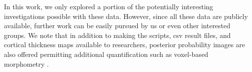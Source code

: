 In this work, we only explored a portion of the potentially
interesting investigations possible with these data.  However,
since all these data are publicly available, further work can
be easily pursued by us or even other interested groups.  We 
note that in addition to making the scripts, csv result files,
and cortical thickness maps available to researchers, 
posterior probability images are also offered permitting additional
quantification such as voxel-based morphometry \citep{ashburner2000}.
